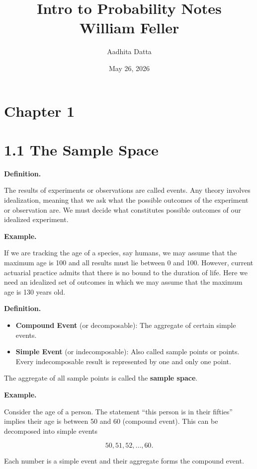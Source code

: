 \documentclass[12pt]{article}
\title{\textbf{Intro to Probability Notes}\\[0.3em]
\large William Feller}
\author{Aadhita Datta}
\date{May 26, 2026}
\begin{document}
\maketitle

\section*{Chapter 1}

\section*{1.1 The Sample Space}

\textbf{Definition.}

The results of experiments or observations are called events. Any theory involves idealization, meaning that we ask what the possible outcomes of the experiment or observation are. We must decide what constitutes possible outcomes of our idealized experiment.

\textbf{Example.}

If we are tracking the age of a species, say humans, we may assume that the maximum age is 100 and all results must lie between 0 and 100. However, current actuarial practice admits that there is no bound to the duration of life. Here we need an idealized set of outcomes in which we may assume that the maximum age is 130 years old.

\textbf{Definition.}

\begin{itemize}
    \item \textbf{Compound Event} (or decomposable): The aggregate of certain simple events.

    \item \textbf{Simple Event} (or indecomposable): Also called sample points or points. Every indecomposable result is represented by one and only one point.
\end{itemize}

The aggregate of all sample points is called the \textbf{sample space}.

\textbf{Example.}

Consider the age of a person. The statement ``this person is in their fifties'' implies their age is between 50 and 60 (compound event). This can be decomposed into simple events

\[
50,51,52,\ldots,60.
\]

Each number is a simple event and their aggregate forms the compound event.
\end{document}
